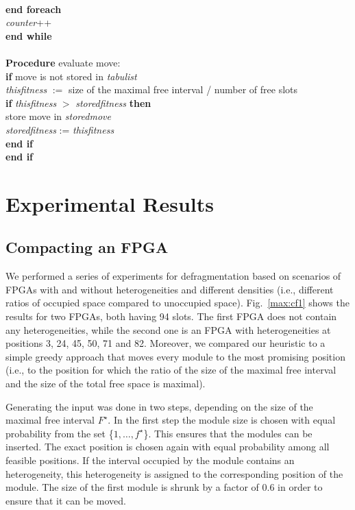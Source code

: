 \documentclass{article}
\begin{document}
\begin{algorithm}[p]
\begin{tabbing}
\>\\
\> {\bf end foreach}\\
\> {\it counter}++\\
{\bf end while}\\
\\
{\bf Procedure} evaluate move:\\
\> {\bf if} move is not stored in {\it tabulist}\\
\>\> {\it thisfitness} $:=$ size of the maximal free interval / number of free slots \\
\>\> {\bf if} {\it thisfitness} $>$ {\it storedfitness} {\bf then}\\
\>\>\> store move in {\it storedmove}\\
\>\>\> {\it storedfitness} := {\it thisfitness}\\
\>\> {\bf end if}\\
\> {\bf end if}
\end{tabbing}
\end{algorithm}

\section{Experimental Results}
\label{sec:experiments}

\subsection{Compacting an FPGA}
We performed a series of experiments for defragmentation based on scenarios of FPGAs with and 
without heterogeneities and different densities (i.e., different ratios of
occupied space compared to unoccupied space). Fig.~\ref{max:cf1} shows the results
for two FPGAs, both having 94
slots. The first FPGA does not contain any heterogeneities, while
the second one is an FPGA with heterogeneities at 
positions 3, 24, 45, 50, 71 and 82. Moreover, we compared our heuristic
to a simple greedy approach that moves every module to the most
promising position (i.e., to the position for which the ratio of
the size of the maximal free interval and 
the size of the total free space is maximal).

Generating the input was done in two steps, depending on the
size of the maximal free interval $F^\star$. In the first step
the module size is chosen with equal probability from the set
\{$1,\ldots, f^\star$\}. This ensures that the modules can be
inserted. The exact position is chosen again with equal probability
among all feasible positions. If the interval
occupied by the module contains an heterogeneity, this heterogeneity
is assigned to the corresponding position of the module. The size of
the first module is shrunk by a factor of $0.6$ in order to ensure
that it can be moved.
\end{document}
